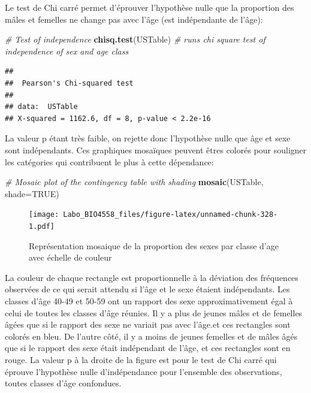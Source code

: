 \documentclass[
  12pt,
]{book}
\newenvironment{Shaded}{\begin{snugshade}}{\end{snugshade}}
\newcommand{\CommentTok}[1]{\textcolor[rgb]{0.56,0.35,0.01}{\textit{#1}}}
\newcommand{\DataTypeTok}[1]{\textcolor[rgb]{0.13,0.29,0.53}{#1}}
\newcommand{\KeywordTok}[1]{\textcolor[rgb]{0.13,0.29,0.53}{\textbf{#1}}}
\newcommand{\NormalTok}[1]{#1}
\newcommand{\OtherTok}[1]{\textcolor[rgb]{0.56,0.35,0.01}{#1}}
\begin{document}
Le test de Chi carré permet d'éprouver l'hypothèse nulle que la proportion des mâles et femelles ne change pas avec l'âge (est indépendante de l'âge):

\begin{Shaded}
\begin{Highlighting}[]
\CommentTok{\# Test of independence}
\KeywordTok{chisq.test}\NormalTok{(USTable) }\CommentTok{\# runs chi square test of independence of sex and age class}
\end{Highlighting}
\end{Shaded}

\begin{verbatim}
## 
##  Pearson's Chi-squared test
## 
## data:  USTable
## X-squared = 1162.6, df = 8, p-value < 2.2e-16
\end{verbatim}

La valeur p étant très faible, on rejette donc l'hypothèse nulle que âge et sexe sont indépendants. Ces graphiques mosaïques peuvent êtres colorés pour souligner les catégories qui contribuent le plus à cette dépendance:

\begin{Shaded}
\begin{Highlighting}[]
\CommentTok{\# Mosaic plot of the contingency table with shading}
\KeywordTok{mosaic}\NormalTok{(USTable, }\DataTypeTok{shade=}\OtherTok{TRUE}\NormalTok{)}
\end{Highlighting}
\end{Shaded}

\begin{figure}
\centering
\texttt{[image: Labo\_BIO4558\_files/figure-latex/unnamed-chunk-328-1.pdf]}
\caption{\label{fig:unnamed-chunk-328}Représentation mosaique de la proportion des sexes par classe d'age avec échelle de couleur}
\end{figure}

La couleur de chaque rectangle est proportionnelle à la déviation des fréquences observées de ce qui serait attendu si l'âge et le sexe étaient indépendants. Les classes d'âge 40-49 et 50-59 ont un rapport des sexe approximativement égal à celui de toutes les classes d'âge réunies. Il y a plus de jeunes mâles et de femelles âgées que si le rapport des sexe ne variait pas avec l'âge.et ces rectangles sont colorés en bleu. De l'autre côté, il y a moins de jeunes femelles et de mâles âgés que si le rapport des sexe était indépendant de l'âge, et ces rectangles sont en rouge. La valeur p à la droite de la figure est pour le test de Chi carré qui éprouve l'hypothèse nulle d'indépendance pour l'ensemble des observations, toutes classes d'âge confondues.
\end{document}
